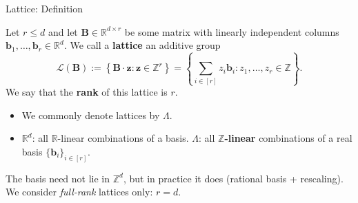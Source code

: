 \documentclass{zkdl-presentation-template}
\begin{document}
    \begin{frame}{Lattice: Definition}
        \begin{definition}
            Let $r \leq d$ and let $\mathbf{B} \in \mathbb{R}^{d \times r}$ be some matrix with linearly independent columns $\mathbf{b}_1,\dots,\mathbf{b}_r \in \mathbb{R}^d$.
            We call a \textbf{lattice} an additive group
            \begin{equation*}
                \mathcal{L}(\mathbf{B}) := \left\{\mathbf{B}\cdot\mathbf{z}: \mathbf{z} \in \mathbb{Z}^r\right\} = \left\{\sum_{i \in [r]}z_i\mathbf{b}_i: z_1,\dots,z_r \in \mathbb{Z}\right\}.
            \end{equation*}
            We say that the \textbf{rank} of this lattice is $r$.
        \end{definition}
        \pause

        \begin{itemize}
            \item We commonly denote lattices by $\Lambda$.
            \item $\mathbb{R}^d$: all $\mathbb{R}$-linear combinations of a basis. $\Lambda$: all \textbf{$\mathbb{Z}$-linear} combinations of a real basis $\{\mathbf{b}_i\}_{i \in [r]}$.\pause
        \end{itemize}

        \begin{remark}
            The basis need not lie in $\mathbb{Z}^d$, but in practice it does (rational basis + rescaling). We consider \textit{full-rank} lattices only: $r = d$.
        \end{remark}
    \end{frame}
\end{document}
